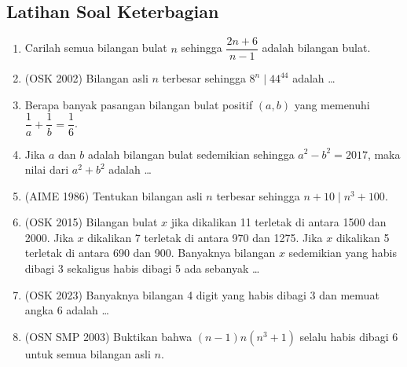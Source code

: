 \subsection{Latihan Soal Keterbagian}
\begin{enumerate}    
    \item Carilah semua bilangan bulat $n$ sehingga $\dfrac{2n+6}{n-1}$ adalah bilangan bulat.
    
    \item (OSK 2002) Bilangan asli $n$ terbesar sehingga $8^n \mid 44^{44}$ adalah \dots
    
    \item Berapa banyak pasangan bilangan bulat positif $(a,b)$ yang memenuhi $\dfrac{1}{a}+\dfrac{1}{b}=\dfrac{1}{6}$.
    
    \item Jika $a$ dan $b$ adalah bilangan bulat sedemikian sehingga $a^2-b^2=2017$, maka nilai dari $a^2+b^2$ adalah \dots
    
    \item (AIME 1986) Tentukan bilangan asli $n$ terbesar sehingga $n+10 \mid n^3+100$.

    \item (OSK 2015) Bilangan bulat $x$ jika dikalikan 11 terletak di antara 1500 dan 2000. Jika $x$ dikalikan 7 terletak di antara 970 dan 1275. Jika $x$ dikalikan 5 terletak di antara 690 dan 900. Banyaknya bilangan $x$ sedemikian yang habis dibagi 3 sekaligus habis dibagi 5 ada sebanyak \ldots

    \item (OSK 2023) Banyaknya bilangan 4 digit yang habis dibagi 3 dan memuat angka 6 adalah \ldots
    
    \item (OSN SMP 2003) Buktikan bahwa $(n-1)n(n^3+1)$ selalu habis dibagi 6 untuk semua bilangan asli $n$.
    
\end{enumerate}
